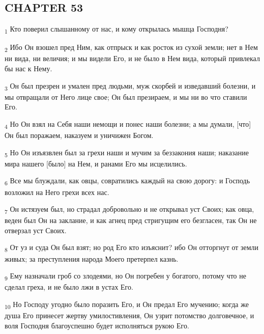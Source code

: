 \subsection{CHAPTER 53}
\begin{tcolorbox}
\textsubscript{1} Кто поверил слышанному от нас, и кому открылась мышца Господня?
\end{tcolorbox}
\begin{tcolorbox}
\textsubscript{2} Ибо Он взошел пред Ним, как отпрыск и как росток из сухой земли; нет в Нем ни вида, ни величия; и мы видели Его, и не было в Нем вида, который привлекал бы нас к Нему.
\end{tcolorbox}
\begin{tcolorbox}
\textsubscript{3} Он был презрен и умален пред людьми, муж скорбей и изведавший болезни, и мы отвращали от Него лице свое; Он был презираем, и мы ни во что ставили Его.
\end{tcolorbox}
\begin{tcolorbox}
\textsubscript{4} Но Он взял на Себя наши немощи и понес наши болезни; а мы думали, [что] Он был поражаем, наказуем и уничижен Богом.
\end{tcolorbox}
\begin{tcolorbox}
\textsubscript{5} Но Он изъязвлен был за грехи наши и мучим за беззакония наши; наказание мира нашего [было] на Нем, и ранами Его мы исцелились.
\end{tcolorbox}
\begin{tcolorbox}
\textsubscript{6} Все мы блуждали, как овцы, совратились каждый на свою дорогу: и Господь возложил на Него грехи всех нас.
\end{tcolorbox}
\begin{tcolorbox}
\textsubscript{7} Он истязуем был, но страдал добровольно и не открывал уст Своих; как овца, веден был Он на заклание, и как агнец пред стригущим его безгласен, так Он не отверзал уст Своих.
\end{tcolorbox}
\begin{tcolorbox}
\textsubscript{8} От уз и суда Он был взят; но род Его кто изъяснит? ибо Он отторгнут от земли живых; за преступления народа Моего претерпел казнь.
\end{tcolorbox}
\begin{tcolorbox}
\textsubscript{9} Ему назначали гроб со злодеями, но Он погребен у богатого, потому что не сделал греха, и не было лжи в устах Его.
\end{tcolorbox}
\begin{tcolorbox}
\textsubscript{10} Но Господу угодно было поразить Его, и Он предал Его мучению; когда же душа Его принесет жертву умилостивления, Он узрит потомство долговечное, и воля Господня благоуспешно будет исполняться рукою Его.
\end{tcolorbox}

